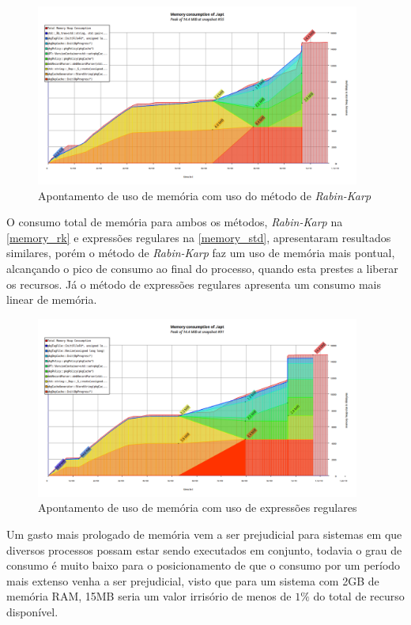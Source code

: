 \begin{figure}[htbp]
  \centering
  \includegraphics[width=0.95\textwidth]{figuras/memory_rk.png}
  \caption{Apontamento de uso de memória com uso do método de \textit{Rabin-Karp}}
  \label{memory_rk}
\end{figure}

O consumo total de memória para ambos os métodos, \textit{Rabin-Karp} na \autoref{memory_rk} e expressões regulares na \autoref{memory_std},  apresentaram resultados similares, porém o método de \textit{Rabin-Karp} faz um uso de memória mais pontual, alcançando o pico de consumo ao final do processo, quando esta prestes a liberar os recursos. Já o método de expressões regulares apresenta um consumo mais linear de memória. 


\begin{figure}[htbp]
  \centering
  \includegraphics[width=0.95\textwidth]{figuras/memory_regex.png}
  \caption{Apontamento de uso de memória com uso de expressões regulares}
  \label{memory_std}
\end{figure}

Um gasto mais prologado de memória vem a ser prejudicial para sistemas em que diversos processos possam estar sendo executados em conjunto, todavia o grau de consumo é muito baixo para o posicionamento de que o consumo por um período mais extenso venha a ser prejudicial, visto que para um sistema com 2GB de memória RAM, 15MB seria um valor irrisório de menos de $1\%$ do total de recurso disponível.

